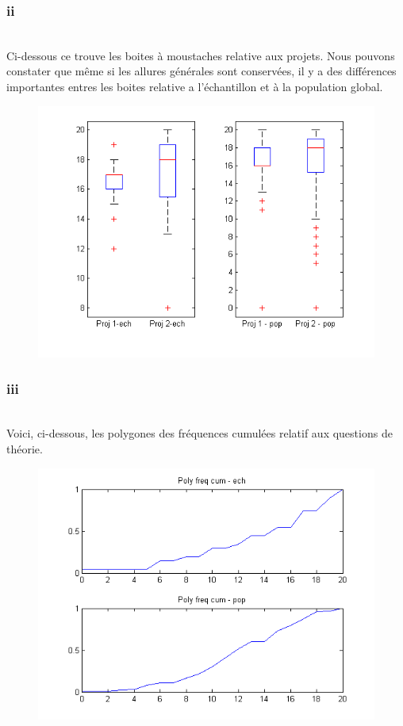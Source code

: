 \documentclass[10pt,a4paper]{article}
\begin{document}
\subsubsection*{ii}
\ \\

Ci-dessous ce trouve les boites à moustaches relative aux projets. 
Nous pouvons constater que même si les allures générales sont conservées, il y a des différences importantes entres les boites relative a l'échantillon et à la population global.  

\begin{figure}[h]
\centering
\includegraphics[scale= 0.5]{2aii_graphe.png}
\end{figure}



\subsubsection*{iii}
\ \\

Voici, ci-dessous, les polygones des fréquences cumulées relatif aux questions de théorie. 
\begin{figure}[h]
\centering
\includegraphics[scale= 0.5]{2aiii_graphe.png}
\end{figure}
\ \\
\end{document}
